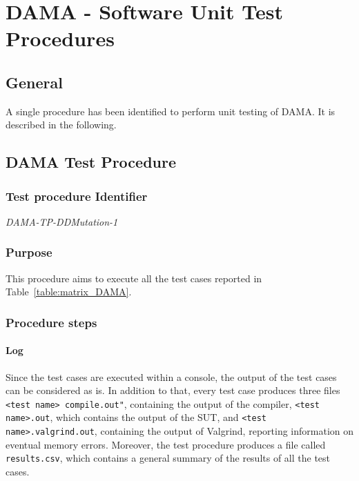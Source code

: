 
\chapter{DAMA - Software Unit Test Procedures}
\label{chap:proc_DAMA}

\section{General}

A single procedure has been identified to perform unit testing of DAMA. It is described in the following.

\section{DAMA Test Procedure}

\subsection{Test procedure Identifier}

\emph{DAMA-TP-DDMutation-1}


\subsection{Purpose}

This procedure aims to execute all the test cases reported in Table~\ref{table:matrix_DAMA}.

\subsection{Procedure steps}

\subsubsection{Log}
Since the test cases are executed within a console, the output of the test cases can be considered as is.
In addition to that, every test case produces three files \texttt{<test name> compile.out"}, containing the output of the compiler, \texttt{<test name>.out}, which contains the output of the SUT, and \texttt{<test name>.valgrind.out}, containing the output of Valgrind, reporting information on eventual memory errors.
Moreover, the test procedure produces a file called \texttt{results.csv}, which contains a general summary of the results of all the test cases.

